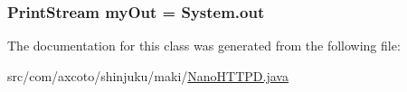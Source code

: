 \hypertarget{classcom_1_1axcoto_1_1shinjuku_1_1maki_1_1_nano_h_t_t_p_d_ac2fd4a658e551e440d2bced445107375}{
\subsubsection[{my\-Out}]{\setlength{\rightskip}{0pt plus 5cm}\-Print\-Stream {\bf my\-Out} = \-System.\-out}}\label{classcom_1_1axcoto_1_1shinjuku_1_1maki_1_1_nano_h_t_t_p_d_ac2fd4a658e551e440d2bced445107375}


\-The documentation for this class was generated from the following file\-:\begin{DoxyCompactItemize}
\item 
src/com/axcoto/shinjuku/maki/\hyperlink{_nano_h_t_t_p_d_8java}{\-Nano\-H\-T\-T\-P\-D.\-java}\end{DoxyCompactItemize}
